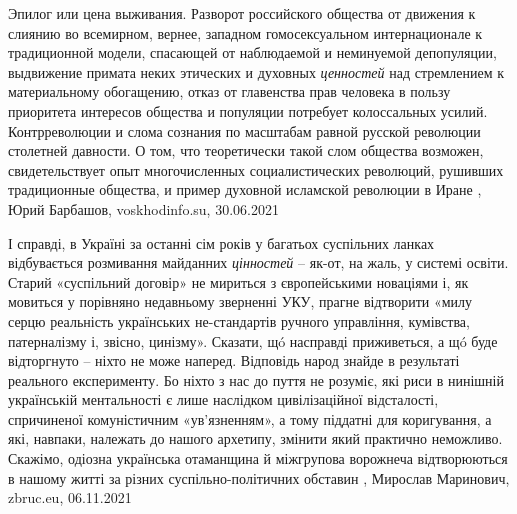 Эпилог или цена выживания. Разворот российского общества от движения к слиянию во всемирном, вернее,
западном гомосексуальном интернационале к традиционной модели, спасающей от
наблюдаемой и неминуемой депопуляции, выдвижение примата неких этических и
духовных \emph{ценностей} над стремлением к материальному обогащению, отказ от
главенства прав человека в пользу приоритета интересов общества и популяции
потребует колоссальных усилий. Контрреволюции и слома сознания по масштабам
равной русской революции столетней давности. О том, что теоретически такой слом
общества возможен, свидетельствует опыт многочисленных социалистических
революций, рушивших традиционные общества, и пример духовной исламской
революции в Иране
, 
Юрий Барбашов, voskhodinfo.su, 30.06.2021

І справді, в Україні за останні сім років у багатьох суспільних ланках
відбувається розмивання майданних \emph{цінностей} – як-от, на жаль, у системі освіти.
Старий «суспільний договір» не мириться з європейськими новаціями і, як
мовиться у порівняно недавньому зверненні УКУ, прагне відтворити «милу серцю
реальність українських не-стандартів ручного управління, кумівства,
патерналізму і, звісно, цинізму».  Сказати, щó насправді приживеться, а щó буде
відторгнуто – ніхто не може наперед. Відповідь народ знайде в результаті
реального експерименту. Бо ніхто з нас до пуття не розуміє, які риси в нинішній
українській ментальності є лише наслідком цивілізаційної відсталості,
спричиненої комуністичним «ув’язненням», а тому піддатні для коригування, а
які, навпаки, належать до нашого архетипу, змінити який практично неможливо.
Скажімо, одіозна українська отаманщина й міжгрупова ворожнеча відтворюються в
нашому житті за різних суспільно-політичних обставин
, 
Мирослав Маринович, zbruc.eu, 06.11.2021
